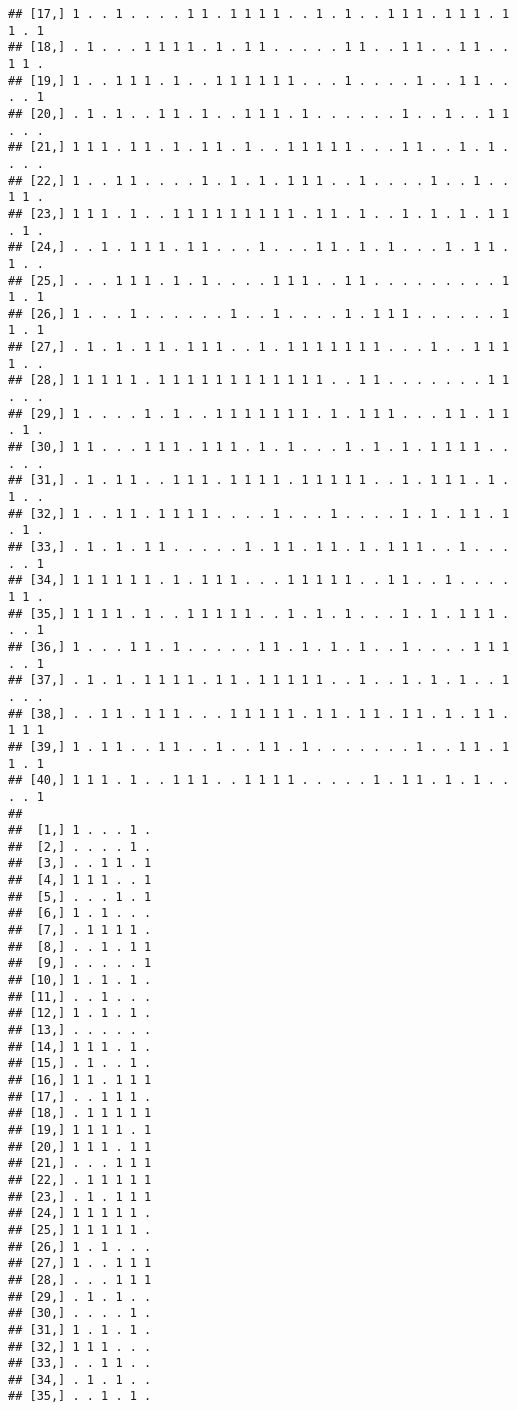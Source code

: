 \documentclass{article}\usepackage[]{graphicx}\usepackage[]{color}
\makeatletter
\newenvironment{kframe}{%
 \def\at@end@of@kframe{}%
 \ifinner\ifhmode%
  \def\at@end@of@kframe{\end{minipage}}%
  \begin{minipage}{\columnwidth}%
 \fi\fi%
 \def\FrameCommand##1{\hskip\@totalleftmargin \hskip-\fboxsep
 \colorbox{shadecolor}{##1}\hskip-\fboxsep
     \hskip-\linewidth \hskip-\@totalleftmargin \hskip\columnwidth}%
 \MakeFramed {\advance\hsize-\width
   \@totalleftmargin\z@ \linewidth\hsize
   \@setminipage}}%
 {\par\unskip\endMakeFramed%
 \at@end@of@kframe}
\newenvironment{knitrout}{}{} %
\makeatother
\begin{document}
\begin{knitrout}
\begin{kframe}
\begin{verbatim}
## [17,] 1 . . 1 . . . . 1 1 . 1 1 1 1 . . 1 . 1 . . 1 1 1 . 1 1 1 . 1 1 . 1
## [18,] . 1 . . . 1 1 1 1 . 1 . 1 1 . . . . . 1 1 . . 1 1 . . 1 1 . . 1 1 .
## [19,] 1 . . 1 1 1 . 1 . . 1 1 1 1 1 1 . . . 1 . . . . 1 . . 1 1 . . . . 1
## [20,] . 1 . 1 . . 1 1 . 1 . . 1 1 1 . 1 . . . . . . 1 . . 1 . . 1 1 . . .
## [21,] 1 1 1 . 1 1 . 1 . 1 1 . 1 . . 1 1 1 1 1 . . . 1 1 . . 1 . 1 . . . .
## [22,] 1 . . 1 1 . . . . 1 . 1 . 1 . 1 1 1 . . 1 . . . . 1 . . 1 . . 1 1 .
## [23,] 1 1 1 . 1 . . 1 1 1 1 1 1 1 1 1 . 1 1 . 1 . . 1 . 1 . 1 . 1 1 . 1 .
## [24,] . . 1 . 1 1 1 . 1 1 . . . 1 . . . 1 1 . 1 . 1 . . . 1 . 1 1 . 1 . .
## [25,] . . . 1 1 1 . 1 . 1 . . . . 1 1 1 . . 1 1 . . . . . . . . . 1 1 . 1
## [26,] 1 . . . 1 . . . . . . 1 . . 1 . . . . 1 . 1 1 1 . . . . . . 1 1 . 1
## [27,] . 1 . 1 . 1 1 . 1 1 1 . . 1 . 1 1 1 1 1 1 1 . . . 1 . . 1 1 1 1 . .
## [28,] 1 1 1 1 1 . 1 1 1 1 1 1 1 1 1 1 1 1 . . 1 1 . . . . . . . 1 1 . . .
## [29,] 1 . . . . 1 . 1 . . 1 1 1 1 1 1 1 . 1 . 1 1 1 . . . 1 1 . 1 1 . 1 .
## [30,] 1 1 . . . 1 1 1 . 1 1 1 . 1 . 1 . . . 1 . 1 . 1 . 1 1 1 1 . . . . .
## [31,] . 1 . 1 1 . . 1 1 1 . 1 1 1 1 . 1 1 1 1 1 . . 1 . 1 1 1 . 1 . 1 . .
## [32,] 1 . . 1 1 . 1 1 1 1 . . . . 1 . . . 1 . . . . 1 . 1 . 1 1 . 1 . 1 .
## [33,] . 1 . 1 . 1 1 . . . . . 1 . 1 1 . 1 1 . 1 . 1 1 1 . . 1 . . . . . 1
## [34,] 1 1 1 1 1 1 . 1 . 1 1 1 . . . 1 1 1 1 1 . . 1 1 . . 1 . . . . 1 1 .
## [35,] 1 1 1 1 . 1 . . 1 1 1 1 1 . . 1 . 1 . 1 . . . 1 . 1 . 1 1 1 . . . 1
## [36,] 1 . . . 1 1 . 1 . . . . . 1 1 . 1 . 1 . 1 . . 1 . . . . 1 1 1 . . 1
## [37,] . 1 . 1 . 1 1 1 1 . 1 1 . 1 1 1 1 1 . . 1 . . 1 . 1 . 1 . . 1 . . .
## [38,] . . 1 1 . 1 1 1 . . . 1 1 1 1 1 . 1 1 . 1 1 . 1 1 . 1 . 1 1 . 1 1 1
## [39,] 1 . 1 1 . . 1 1 . . 1 . . 1 1 . 1 . . . . . . . 1 . . 1 1 . 1 1 . 1
## [40,] 1 1 1 . 1 . . 1 1 1 . . 1 1 1 1 . . . . . 1 . 1 1 . 1 . 1 . . . . 1
##                  
##  [1,] 1 . . . 1 .
##  [2,] . . . . 1 .
##  [3,] . . 1 1 . 1
##  [4,] 1 1 1 . . 1
##  [5,] . . . 1 . 1
##  [6,] 1 . 1 . . .
##  [7,] . 1 1 1 1 .
##  [8,] . . 1 . 1 1
##  [9,] . . . . . 1
## [10,] 1 . 1 . 1 .
## [11,] . . 1 . . .
## [12,] 1 . 1 . 1 .
## [13,] . . . . . .
## [14,] 1 1 1 . 1 .
## [15,] . 1 . . 1 .
## [16,] 1 1 . 1 1 1
## [17,] . . 1 1 1 .
## [18,] . 1 1 1 1 1
## [19,] 1 1 1 1 . 1
## [20,] 1 1 1 . 1 1
## [21,] . . . 1 1 1
## [22,] . 1 1 1 1 1
## [23,] . 1 . 1 1 1
## [24,] 1 1 1 1 1 .
## [25,] 1 1 1 1 1 .
## [26,] 1 . 1 . . .
## [27,] 1 . . 1 1 1
## [28,] . . . 1 1 1
## [29,] . 1 . 1 . .
## [30,] . . . . 1 .
## [31,] 1 . 1 . 1 .
## [32,] 1 1 1 . . .
## [33,] . . 1 1 . .
## [34,] . 1 . 1 . .
## [35,] . . 1 . 1 .

\end{verbatim}
\end{kframe}
\end{knitrout}
\end{document}
